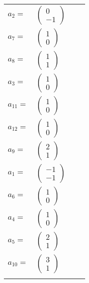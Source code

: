 \documentclass[1p]{elsarticle_modified}
\theoremstyle{definition}
\begin{document}
\begin{tabular}{m{7pt} m{180pt} m{7pt} m{180pt} }
\flushright $a_{2}=$&$\begin{pmatrix}0\\-1\end{pmatrix}$ \\
\flushright $a_{7}=$&$\begin{pmatrix}1\\0\end{pmatrix}$ \\
\flushright $a_{8}=$&$\begin{pmatrix}1\\1\end{pmatrix}$ \\
\flushright $a_{3}=$&$\begin{pmatrix}1\\0\end{pmatrix}$ \\
\flushright $a_{11}=$&$\begin{pmatrix}1\\0\end{pmatrix}$ \\
\flushright $a_{12}=$&$\begin{pmatrix}1\\0\end{pmatrix}$ \\
\flushright $a_{9}=$&$\begin{pmatrix}2\\1\end{pmatrix}$ \\
\flushright $a_{1}=$&$\begin{pmatrix}-1\\-1\end{pmatrix}$ \\
\flushright $a_{6}=$&$\begin{pmatrix}1\\0\end{pmatrix}$ \\
\flushright $a_{4}=$&$\begin{pmatrix}1\\0\end{pmatrix}$ \\
\flushright $a_{5}=$&$\begin{pmatrix}2\\1\end{pmatrix}$ \\
\flushright $a_{10}=$&$\begin{pmatrix}3\\1\end{pmatrix}$\\&\end{tabular}
\end{document}
